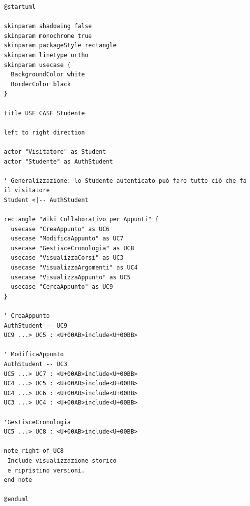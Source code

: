 \begin{verbatim}
@startuml

skinparam shadowing false
skinparam monochrome true
skinparam packageStyle rectangle
skinparam linetype ortho
skinparam usecase {
  BackgroundColor white
  BorderColor black
}

title USE CASE Studente

left to right direction

actor "Visitatore" as Student
actor "Studente" as AuthStudent

' Generalizzazione: lo Studente autenticato può fare tutto ciò che fa il visitatore
Student <|-- AuthStudent

rectangle "Wiki Collaborativo per Appunti" {
  usecase "CreaAppunto" as UC6
  usecase "ModificaAppunto" as UC7
  usecase "GestisceCronologia" as UC8
  usecase "VisualizzaCorsi" as UC3
  usecase "VisualizzaArgomenti" as UC4
  usecase "VisualizzaAppunto" as UC5
  usecase "CercaAppunto" as UC9
}

' CreaAppunto
AuthStudent -- UC9
UC9 ...> UC5 : <U+00AB>include<U+00BB>

' ModificaAppunto
AuthStudent -- UC3
UC5 ...> UC7 : <U+00AB>include<U+00BB>
UC4 ...> UC5 : <U+00AB>include<U+00BB>
UC4 ...> UC6 : <U+00AB>include<U+00BB>
UC3 ...> UC4 : <U+00AB>include<U+00BB>

'GestisceCronologia
UC5 ...> UC8 : <U+00AB>include<U+00BB>

note right of UC8
 Include visualizzazione storico
 e ripristino versioni.
end note

@enduml
\end{verbatim}